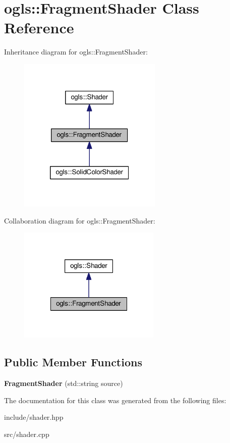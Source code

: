 \hypertarget{classogls_1_1FragmentShader}{\section{ogls\-:\-:Fragment\-Shader Class Reference}
\label{classogls_1_1FragmentShader}
}


Inheritance diagram for ogls\-:\-:Fragment\-Shader\-:\nopagebreak
\begin{figure}[H]
\begin{center}
\leavevmode
\includegraphics[width=194pt]{d1/d60/classogls_1_1FragmentShader__inherit__graph}
\end{center}
\end{figure}


Collaboration diagram for ogls\-:\-:Fragment\-Shader\-:\nopagebreak
\begin{figure}[H]
\begin{center}
\leavevmode
\includegraphics[width=192pt]{d9/d73/classogls_1_1FragmentShader__coll__graph}
\end{center}
\end{figure}
\subsection*{Public Member Functions}
\begin{DoxyCompactItemize}
\item 
\hypertarget{classogls_1_1FragmentShader_aeb28087000e1456f5d31e5857f134644}{{\bfseries Fragment\-Shader} (std\-::string source)}\label{classogls_1_1FragmentShader_aeb28087000e1456f5d31e5857f134644}

\end{DoxyCompactItemize}


The documentation for this class was generated from the following files\-:\begin{DoxyCompactItemize}
\item 
include/shader.\-hpp\item 
src/shader.\-cpp\end{DoxyCompactItemize}
